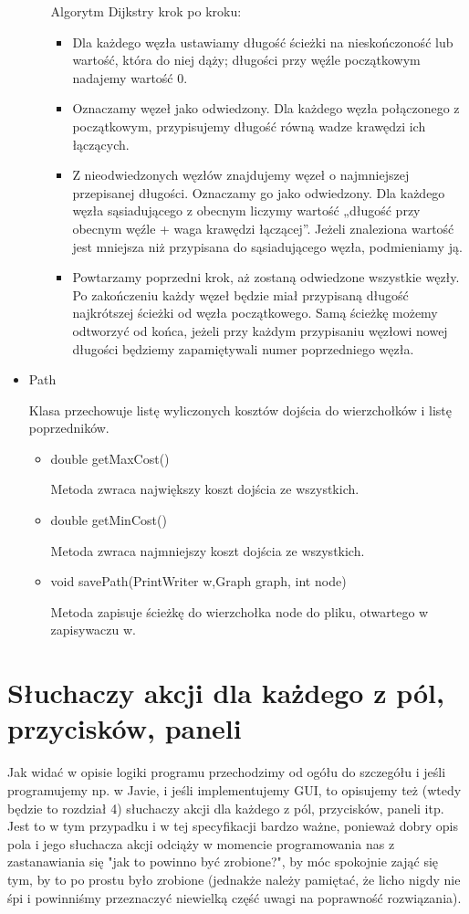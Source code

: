 \documentclass[]{article}
\begin{document}
\begin{itemize}
\begin{itemize}
        Algorytm Dijkstry krok po kroku:
        \begin{itemize}
            \item Dla każdego węzła ustawiamy długość ścieżki na nieskończoność lub wartość, która do niej dąży; długości przy węźle początkowym nadajemy wartość 0. 
            \item Oznaczamy węzeł jako odwiedzony. Dla każdego węzła połączonego z początkowym, przypisujemy długość równą wadze krawędzi ich łączących.
            \item Z nieodwiedzonych węzłów znajdujemy węzeł o najmniejszej przepisanej długości. Oznaczamy go jako odwiedzony. Dla każdego węzła sąsiadującego z obecnym liczymy wartość „długość przy obecnym węźle + waga krawędzi łączącej”. Jeżeli znaleziona wartość jest mniejsza niż przypisana do sąsiadującego węzła, podmieniamy ją.
            \item Powtarzamy poprzedni krok, aż zostaną odwiedzone wszystkie węzły. Po zakończeniu każdy węzeł będzie miał przypisaną długość najkrótszej ścieżki od węzła początkowego. Samą ścieżkę możemy odtworzyć od końca, jeżeli przy każdym przypisaniu węzłowi nowej długości będziemy zapamiętywali numer poprzedniego węzła.
        \end{itemize}
    \end{itemize}
    \item Path
  
    Klasa przechowuje listę wyliczonych kosztów dojścia do wierzchołków i listę poprzedników.
        \begin{itemize}
        \item double getMaxCost()
        
        Metoda zwraca największy koszt dojścia ze wszystkich.
        \item double getMinCost()
        
        Metoda zwraca najmniejszy koszt dojścia ze wszystkich.
        \item void savePath(PrintWriter w,Graph graph, int node)
        
        Metoda zapisuje ścieżkę do wierzchołka node do pliku, otwartego w zapisywaczu w.
    \end{itemize}
\end{itemize}

\section{Słuchaczy akcji dla każdego z pól, przycisków, paneli}\label{header-n279}
 Jak widać w opisie logiki programu przechodzimy od ogółu do szczegółu i jeśli programujemy np. w Javie, i jeśli implementujemy GUI, to opisujemy też (wtedy będzie to rozdział 4) słuchaczy akcji dla każdego z pól, przycisków, paneli itp. Jest to w tym przypadku i w tej specyfikacji bardzo ważne, ponieważ dobry opis pola i jego słuchacza akcji odciąży w momencie programowania nas z zastanawiania się "jak to powinno być zrobione?", by móc spokojnie zająć się tym, by to po prostu było zrobione (jednakże należy pamiętać, że licho nigdy nie śpi i powinniśmy przeznaczyć niewielką część uwagi na poprawność rozwiązania).
\end{document}
